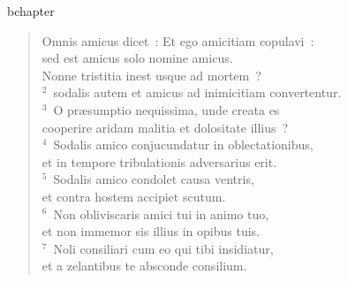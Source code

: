 bchapter\begin{verse}\vspace{-19pt}Omnis amicus dicet~: Et ego amicitiam copulavi~:\\ sed est amicus solo nomine amicus.\\ Nonne tristitia inest usque ad mortem~?\\
${}^{2}$~sodalis autem et amicus ad inimicitiam convertentur.\\
${}^{3}$~O pr\ae sumptio nequissima, unde creata es\\ cooperire aridam malitia et dolositate illius~?\\
${}^{4}$~Sodalis amico conjucundatur in oblectationibus,\\ et in tempore tribulationis adversarius erit.\\
${}^{5}$~Sodalis amico condolet causa ventris,\\ et contra hostem accipiet scutum.\\
${}^{6}$~Non obliviscaris amici tui in animo tuo,\\ et non immemor sis illius in opibus tuis.\\
${}^{7}$~Noli consiliari cum eo qui tibi insidiatur,\\ et a zelantibus te absconde consilium.\end{verse}


